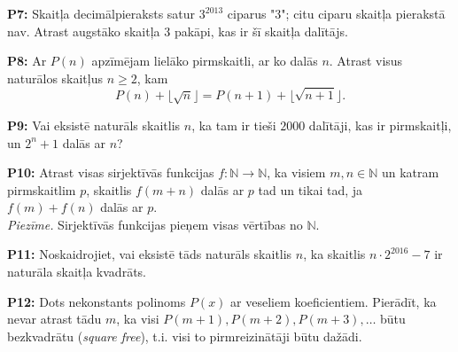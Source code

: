 \documentclass[11pt]{article}
\newenvironment{uzdevums}[1][\unskip]{%
\vspace{3mm}
\noindent
\textbf{#1:}
\noindent}
{}
\begin{document}
\begin{uzdevums}[P7]
Skaitļa decimālpieraksts satur $3^{2013}$ ciparus "3"; 
citu ciparu skaitļa pierakstā nav. Atrast augstāko skaitļa $3$ pakāpi, 
kas ir šī skaitļa dalītājs.
\end{uzdevums}

\begin{uzdevums}[P8]
Ar $P(n)$ apzīmējam lielāko pirmskaitli, ar ko dalās $n$. Atrast
visus naturālos skaitļus $n \geq 2$, kam
$$P(n) + \lfloor \sqrt{n} \rfloor = P(n+1) + \lfloor \sqrt{n+1} \rfloor.$$
\end{uzdevums}

\begin{uzdevums}[P9]
Vai eksistē naturāls skaitlis $n$, ka tam ir tieši $2000$ 
dalītāji, kas ir pirmskaitļi, un $2^n + 1$ dalās ar $n$?
\end{uzdevums}

\begin{uzdevums}[P10]
Atrast visas sirjektīvās funkcijas 
$f : \mathbb{N} \rightarrow \mathbb{N}$, ka
visiem $m, n \in \mathbb{N}$ un katram pirmskaitlim $p$, skaitlis
$f(m+n)$ dalās ar $p$ tad un tikai tad, ja 
$f(m)+f(n)$ dalās ar $p$.\\  
{\em Piezīme.} Sirjektīvās funkcijas pieņem visas vērtības no $\mathbb{N}$.
\end{uzdevums}

\begin{uzdevums}[P11]
Noskaidrojiet, vai eksistē tāds naturāls skaitlis $n$, ka 
skaitlis $n \cdot 2^{2016} - 7$ ir
naturāla skaitļa kvadrāts.
\end{uzdevums}

\begin{uzdevums}[P12]
Dots nekonstants polinoms $P(x)$ ar veseliem koeficientiem. 
Pierādīt, ka nevar atrast tādu $m$, ka visi $P(m+1),P(m+2),P(m+3),\ldots$ būtu bezkvadrātu ({\em square free}),  
t.i. visi to pirmreizinātāji būtu dažādi. 
\end{uzdevums}
\end{document}
